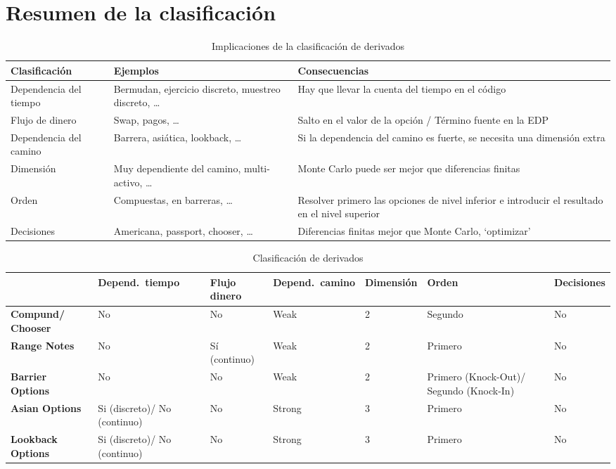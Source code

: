 \section{Resumen de la clasificación}
\begin{table}[H]
    \centering
    \begin{tabularx}{\linewidth}{|X|X|X|}
        \hline
        \textbf{Clasificación} & \textbf{Ejemplos} & \textbf{Consecuencias} \\
        \hline
        Dependencia del tiempo & Bermudan, ejercicio discreto, muestreo discreto, \ldots & Hay que llevar la cuenta del tiempo en el código \\
        \hline
        Flujo de dinero & Swap, pagos, \ldots & Salto en el valor de la opción / Término fuente en la EDP \\
        \hline
        Dependencia del camino & Barrera, asiática, lookback, \ldots & Si la dependencia del camino es fuerte, se necesita una dimensión extra \\
        \hline
        Dimensión & Muy dependiente del camino, multi-activo, \ldots & Monte Carlo puede ser mejor que diferencias finitas \\
        \hline
        Orden & Compuestas, en barreras, \ldots & Resolver primero las opciones de nivel inferior e introducir el resultado en el nivel superior \\
        \hline
        Decisiones & Americana, passport, chooser, \ldots & Diferencias finitas mejor que Monte Carlo, ‘optimizar’ \\
        \hline
    \end{tabularx}
    \caption{Implicaciones de la clasificación de derivados}
\end{table}


\begin{table}[H]
    \centering
    \begin{tabularx}{\linewidth}{|X|X|X|X|X|X|X|}
        \hline
        & \textbf{Depend.\ tiempo} & \textbf{Flujo dinero} & \textbf{Depend.\ camino} & \textbf{Dimensión} & \textbf{Orden} & \textbf{Decisiones} \\
        \hline
        \textbf{Compund/ Chooser} & No & No & Weak & 2 & Segundo & No \\
        \hline
        \textbf{Range Notes} & No & Sí (continuo) & Weak & 2 & Primero & No \\
        \hline
        \textbf{Barrier Options} & No & No & Weak & 2 & Primero (Knock-Out)/ Segundo (Knock-In) & No \\
        \hline
        \textbf{Asian Options} & Si (discreto)/ No (continuo) & No & Strong & 3 & Primero & No \\
        \hline
        \textbf{Lookback Options} & Si (discreto)/ No (continuo) & No & Strong & 3 & Primero & No \\
        \hline
    \end{tabularx}
    \caption{Clasificación de derivados}
\end{table}








